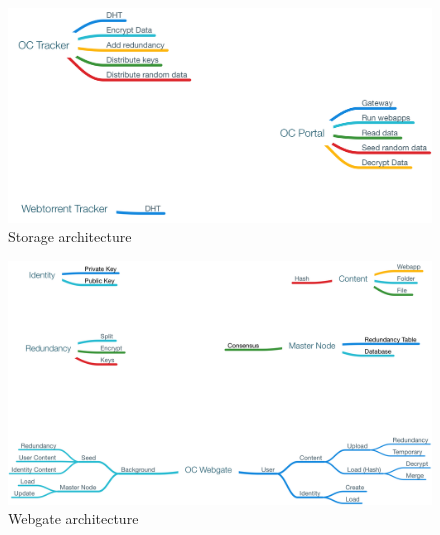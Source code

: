 \begin{figure}[htpb]
\centering
\begin{adjustbox}{center}
\includegraphics[scale=0.5]{annexes/architecture/oc-storage-architecture-latest.png}
\end{adjustbox}
\caption{Storage architecture
\label{fig:oc-storage-architecture-latest}}  
\end{figure}

\begin{figure}[htpb]
\centering
\begin{adjustbox}{center}
\includegraphics[scale=0.45]{annexes/architecture/oc-webgate-architecture-latest.png}
\end{adjustbox}
\caption{Webgate architecture
\label{fig:oc-webgate-architecture-latest}}  
\end{figure}


